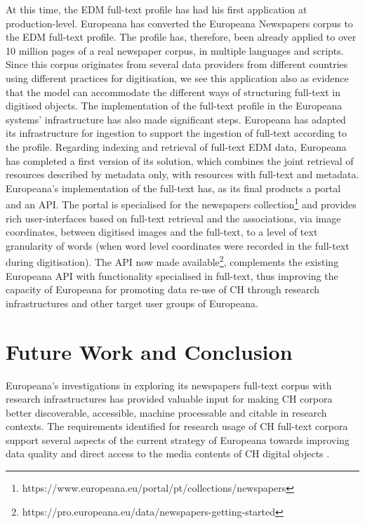 \documentclass[a4paper,UKenglish,cleveref, autoref]{oasics-v2019}
\begin{document}
At this time, the EDM full-text profile has had his first application at production-level. Europeana has converted the Europeana Newspapers corpus to the EDM full-text profile. The profile has, therefore, been already applied to over 10 million pages of a real newspaper corpus, in multiple languages and scripts. Since this corpus originates from several data providers from different countries using different practices for digitisation, we see this application also as evidence that the model can accommodate the different ways of structuring full-text in digitised objects. 
The implementation of the full-text profile in the Europeana systems' infrastructure has also made significant steps. Europeana has adapted its infrastructure for ingestion to support the ingestion of full-text according to the profile. 
Regarding indexing and retrieval of full-text EDM data, Europeana has completed a first version of its solution, which combines the joint retrieval of resources described by metadata only, with resources with full-text and metadata.   
Europeana's implementation of the full-text has, as its final products a portal and an API. The portal is specialised for the newspapers collection\footnote{https://www.europeana.eu/portal/pt/collections/newspapers} and provides rich user-interfaces based on full-text retrieval and the associations, via image coordinates, between digitised images and the full-text, to a level of text granularity of words (when word level coordinates were recorded in the full-text during digitisation). The API now made available\footnote{https://pro.europeana.eu/data/newspapers-getting-started}, complements the existing Europeana API with functionality specialised in full-text, thus improving the capacity of Europeana for promoting data re-use of CH through research infrastructures and other target user groups of Europeana.

\section{Future Work and Conclusion}
\label{sec:conclusion}

Europeana's investigations in exploring its newspapers full-text corpus with research infrastructures has provided valuable input for making CH corpora better discoverable, accessible, machine processable and citable in research contexts. The requirements identified for research usage of CH full-text corpora support several aspects of the current strategy of Europeana towards improving data quality and direct access to the media contents of CH digital objects \cite{publishingGuide}. 
\end{document}
